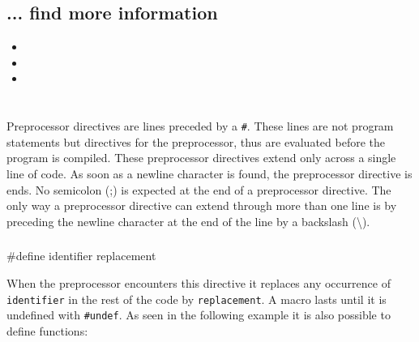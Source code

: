 \documentclass[10pt,a4paper]{scrartcl}
\begin{document}
\begin{multicols*}{2}
\subsection{... find more information}

\begin{itemize}
\item {}
\item {}
\item {}
\end{itemize}
\fi

\glsaddall

\printnoidxglossary[sort=def,title={Terms},nonumberlist=true,nopostdot=true]

\section{}

\subsection{}

Preprocessor directives are lines preceded by a \verb+#+. These lines are not program statements but directives for the preprocessor, thus are evaluated before the program is compiled.
These preprocessor directives extend only across a single line of code. As soon as a newline character is found, the preprocessor directive is ends. No semicolon (;) is expected at the end of a preprocessor directive. The only way a preprocessor directive can extend through more than one line is by preceding the newline character at the end of the line by a backslash (\textbackslash).

\subsubsection{}

\begin{TPCpp}
#define identifier replacement
\end{TPCpp}

When the preprocessor encounters this directive it replaces any occurrence of \verb+identifier+ in the rest of the code by \verb+replacement+. A macro lasts until it is undefined with \verb+#undef+. As seen in the following example it is also possible to define functions:


\end{multicols*}
\end{document}
